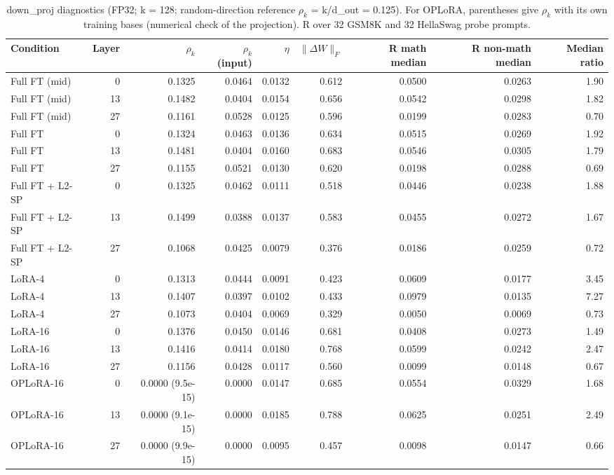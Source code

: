 \begin{table}[t]
\centering
\small
\caption{down\_proj diagnostics (FP32; k = 128; random-direction reference $\rho_k$ = k/d\_out = 0.125). For OPLoRA, parentheses give $\rho_k$ with its own training bases (numerical check of the projection). R over 32 GSM8K and 32 HellaSwag probe prompts.}
\label{tab:t1-diag-full}
\begin{tabular}{lrrrrrrrr}
\toprule
Condition & Layer & $\rho_k$ & $\rho_k$ (input) & $\eta$ & $\|\Delta W\|_F$ & R math median & R non-math median & Median ratio \\
\midrule
Full FT (mid) & 0 & 0.1325 & 0.0464 & 0.0132 & 0.612 & 0.0500 & 0.0263 & 1.90 \\
Full FT (mid) & 13 & 0.1482 & 0.0404 & 0.0154 & 0.656 & 0.0542 & 0.0298 & 1.82 \\
Full FT (mid) & 27 & 0.1161 & 0.0528 & 0.0125 & 0.596 & 0.0199 & 0.0283 & 0.70 \\
Full FT & 0 & 0.1324 & 0.0463 & 0.0136 & 0.634 & 0.0515 & 0.0269 & 1.92 \\
Full FT & 13 & 0.1481 & 0.0404 & 0.0160 & 0.683 & 0.0546 & 0.0305 & 1.79 \\
Full FT & 27 & 0.1155 & 0.0521 & 0.0130 & 0.620 & 0.0198 & 0.0288 & 0.69 \\
Full FT + L2-SP & 0 & 0.1325 & 0.0462 & 0.0111 & 0.518 & 0.0446 & 0.0238 & 1.88 \\
Full FT + L2-SP & 13 & 0.1499 & 0.0388 & 0.0137 & 0.583 & 0.0455 & 0.0272 & 1.67 \\
Full FT + L2-SP & 27 & 0.1068 & 0.0425 & 0.0079 & 0.376 & 0.0186 & 0.0259 & 0.72 \\
LoRA-4 & 0 & 0.1313 & 0.0444 & 0.0091 & 0.423 & 0.0609 & 0.0177 & 3.45 \\
LoRA-4 & 13 & 0.1407 & 0.0397 & 0.0102 & 0.433 & 0.0979 & 0.0135 & 7.27 \\
LoRA-4 & 27 & 0.1073 & 0.0404 & 0.0069 & 0.329 & 0.0050 & 0.0069 & 0.73 \\
LoRA-16 & 0 & 0.1376 & 0.0450 & 0.0146 & 0.681 & 0.0408 & 0.0273 & 1.49 \\
LoRA-16 & 13 & 0.1416 & 0.0414 & 0.0180 & 0.768 & 0.0599 & 0.0242 & 2.47 \\
LoRA-16 & 27 & 0.1156 & 0.0428 & 0.0117 & 0.560 & 0.0099 & 0.0148 & 0.67 \\
OPLoRA-16 & 0 & 0.0000 (9.5e-15) & 0.0000 & 0.0147 & 0.685 & 0.0554 & 0.0329 & 1.68 \\
OPLoRA-16 & 13 & 0.0000 (9.1e-15) & 0.0000 & 0.0185 & 0.788 & 0.0625 & 0.0251 & 2.49 \\
OPLoRA-16 & 27 & 0.0000 (9.9e-15) & 0.0000 & 0.0095 & 0.457 & 0.0098 & 0.0147 & 0.66 \\
\bottomrule
\end{tabular}
\end{table}

